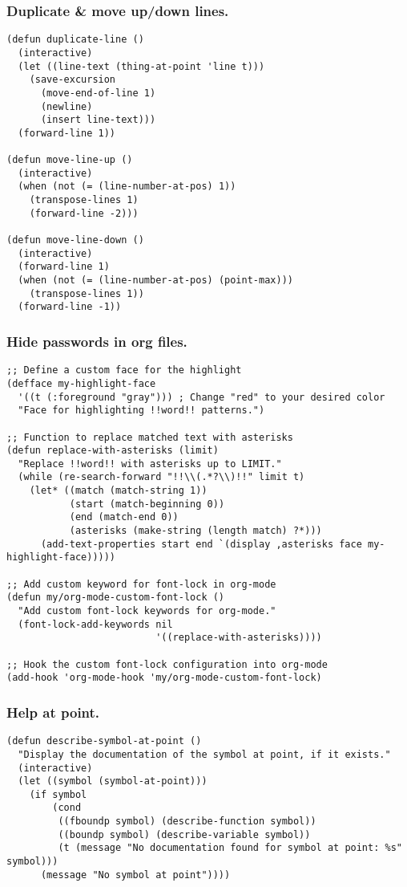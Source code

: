 \documentclass[11pt]{article}
\begin{document}
\subsubsection{Duplicate \& move up/down lines.}
\label{sec:org5313a89}
\begin{verbatim}
(defun duplicate-line ()
  (interactive)
  (let ((line-text (thing-at-point 'line t)))
    (save-excursion
      (move-end-of-line 1)
      (newline)
      (insert line-text)))
  (forward-line 1))

(defun move-line-up ()
  (interactive)
  (when (not (= (line-number-at-pos) 1))
    (transpose-lines 1)
    (forward-line -2)))

(defun move-line-down ()
  (interactive)
  (forward-line 1)
  (when (not (= (line-number-at-pos) (point-max)))
    (transpose-lines 1))
  (forward-line -1))
\end{verbatim}
\subsubsection{Hide passwords in org files.}
\label{sec:org7f99234}
\begin{verbatim}
;; Define a custom face for the highlight
(defface my-highlight-face
  '((t (:foreground "gray"))) ; Change "red" to your desired color
  "Face for highlighting !!word!! patterns.")

;; Function to replace matched text with asterisks
(defun replace-with-asterisks (limit)
  "Replace !!word!! with asterisks up to LIMIT."
  (while (re-search-forward "!!\\(.*?\\)!!" limit t)
    (let* ((match (match-string 1))
           (start (match-beginning 0))
           (end (match-end 0))
           (asterisks (make-string (length match) ?*)))
      (add-text-properties start end `(display ,asterisks face my-highlight-face)))))

;; Add custom keyword for font-lock in org-mode
(defun my/org-mode-custom-font-lock ()
  "Add custom font-lock keywords for org-mode."
  (font-lock-add-keywords nil
                          '((replace-with-asterisks))))

;; Hook the custom font-lock configuration into org-mode
(add-hook 'org-mode-hook 'my/org-mode-custom-font-lock)
\end{verbatim}
\subsubsection{Help at point.}
\label{sec:orgd11633a}
\begin{verbatim}
(defun describe-symbol-at-point ()
  "Display the documentation of the symbol at point, if it exists."
  (interactive)
  (let ((symbol (symbol-at-point)))
    (if symbol
        (cond
         ((fboundp symbol) (describe-function symbol))
         ((boundp symbol) (describe-variable symbol))
         (t (message "No documentation found for symbol at point: %s" symbol)))
      (message "No symbol at point"))))
\end{verbatim}
\end{document}
